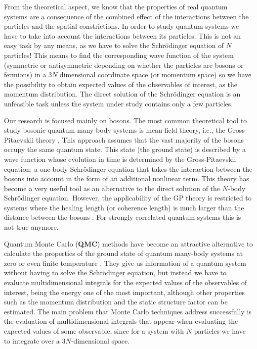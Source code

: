 From the theoretical aspect, we know that the properties of real quantum systems
are a consequence of the combined effect of the interactions between the
particles and the spatial constrictions. In order to study quantum systems we
have to take into account the interactions between its particles. This is not an
easy task by any means, as we have to solve the Schrödinger equation of $N$
particles! This means to find the corresponding wave function of the system
(symmetric or antisymmetric depending on whether the particles are bosons or
fermions) in a $3N$ dimensional coordinate space (or momentum space) so we have
the possibility to obtain expected values of the observables of interest, as the
momentum distribution. The direct solution of the Schrödinger equation is an
unfeasible task unless the system under study contains only a few particles.

Our research is focused mainly on bosons. The most common theoretical tool to
study bosonic quantum many-body systems is mean-field theory, i.e., the
Gross-Pitaevskii theory \cite{bib:gross-il-nuovo-cimento.1961,
  bib:pitaevskii-jetp.1961}, This approach assumes that the vast majority of the
bosons occupy the same quantum state. This state (the ground state) is described
by a wave function whose evolution in time is determined by the Gross-Pitaevskii
equation: a one-body Schrödinger equation that takes the interaction between the
bosons into account in the form of an additional nonlinear term. This theory has
become a very useful tool as an alternative to the direct solution of the
$N$-body Schrödinger equation. However, the applicability of the GP theory is
restricted to systems where the healing length (or coherence length) is much
larger than the distance between the bosons
\cite{bib:pitaevskii-rev-mod-phys.71.463.1999}. For strongly correlated quantum
systems this is not true anymore.

Quantum Monte Carlo ({\textbf{QMC}}) methods have become an attractive
alternative to calculate the properties of the ground state of quantum many-body
systems at zero or even finite temperature
\cite{bib:ceperley-rev-min-geochem.1.2010}. They give us information of a
quantum system without having to solve the Schrödinger equation, but instead we
have to evaluate multidimensional integrals for the expected values of the
observables of interest, being the energy one of the most important, although
other properties such as the momentum distribution and the static structure
factor can be estimated. The main problem that Monte Carlo techniques address
successfully is the evaluation of multidimensional integrals that appear when
evaluating the expected values of some observable, since for a system with $N$
particles we have to integrate over a $3N$-dimensional space.

